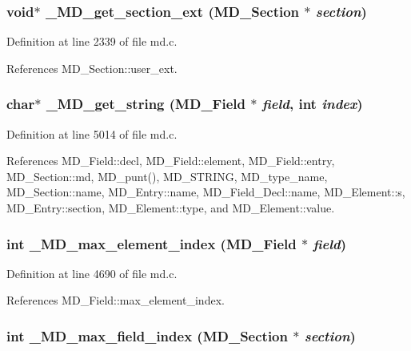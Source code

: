 \subsubsection{\setlength{\rightskip}{0pt plus 5cm}void$\ast$ \_\-MD\_\-get\_\-section\_\-ext (\bf{MD\_\-Section} $\ast$ {\em section})}\label{md_8c_72ad4026d2364185ce238f2bee2a62a5}




Definition at line 2339 of file md.c.

References MD\_\-Section::user\_\-ext.
\subsubsection{\setlength{\rightskip}{0pt plus 5cm}char$\ast$ \_\-MD\_\-get\_\-string (\bf{MD\_\-Field} $\ast$ {\em field}, int {\em index})}\label{md_8c_74fa33246115a2b9e727b11d2783feb2}




Definition at line 5014 of file md.c.

References MD\_\-Field::decl, MD\_\-Field::element, MD\_\-Field::entry, MD\_\-Section::md, MD\_\-punt(), MD\_\-STRING, MD\_\-type\_\-name, MD\_\-Section::name, MD\_\-Entry::name, MD\_\-Field\_\-Decl::name, MD\_\-Element::s, MD\_\-Entry::section, MD\_\-Element::type, and MD\_\-Element::value.
\subsubsection{\setlength{\rightskip}{0pt plus 5cm}int \_\-MD\_\-max\_\-element\_\-index (\bf{MD\_\-Field} $\ast$ {\em field})}\label{md_8c_a9c7f86c59d6fb77e8822c00293520ea}




Definition at line 4690 of file md.c.

References MD\_\-Field::max\_\-element\_\-index.
\subsubsection{\setlength{\rightskip}{0pt plus 5cm}int \_\-MD\_\-max\_\-field\_\-index (\bf{MD\_\-Section} $\ast$ {\em section})}\label{md_8c_4e2d0c00831d31248181c8fc6fbc0ed9}




